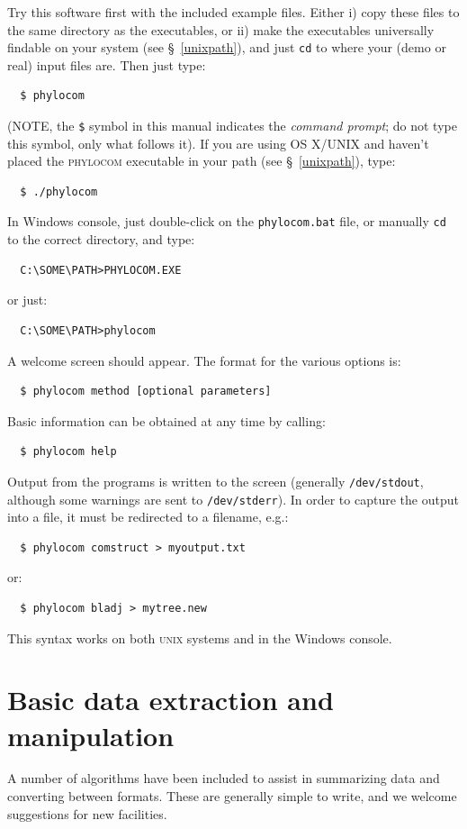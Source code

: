 \documentclass[12pt,letterpaper]{article}
\begin{document}
Try this software first with the included example files.  Either i) copy these
files to the same directory as the executables, or ii) make the
executables universally findable on your system (see
\S~\ref{unixpath}), and just \verb|cd| to where your (demo or real)
input files are.  Then just type:
\begin{verbatim}
  $ phylocom
\end{verbatim}
(NOTE, the \verb|$| symbol in this manual indicates the {\it command
  prompt}; do not type this symbol, only what follows it).  If you are
using OS X/UNIX and haven't placed the {\scshape phylocom} executable
in your path (see \S~\ref{unixpath}), type:
\begin{verbatim}
  $ ./phylocom
\end{verbatim}
In Windows console, just double-click on the \verb|phylocom.bat| file,
or manually \verb|cd| to the correct directory, and type:
\begin{verbatim}
  C:\SOME\PATH>PHYLOCOM.EXE
\end{verbatim}
or just:
\begin{verbatim}
  C:\SOME\PATH>phylocom
\end{verbatim}
A welcome screen should appear. The format for the various options is:
\begin{verbatim}
  $ phylocom method [optional parameters]
\end{verbatim}
Basic information can be obtained at any time by calling: 
\begin{verbatim}
  $ phylocom help
\end{verbatim}

Output from the programs is written to the screen (generally
\verb|/dev/stdout|, although some warnings are sent to
\verb|/dev/stderr|).  In order to capture the output into a file, it
must be redirected to a filename, e.g.:
\begin{verbatim}
  $ phylocom comstruct > myoutput.txt
\end{verbatim}
or:
\begin{verbatim}
  $ phylocom bladj > mytree.new
\end{verbatim}
This syntax works on both {\scshape unix} systems and in the Windows console.

\section{Basic data extraction and manipulation}

A number of algorithms have been included to assist in summarizing
data and converting between formats.  These are generally simple to
write, and we welcome suggestions for new facilities.
\end{document}
